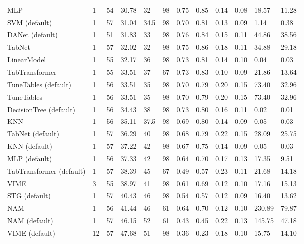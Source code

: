 \begin{tabular}{lllllrllllll}
MLP & 1 & 54 & 30.78 & 32 & 98 & 0.75 & 0.85 & 0.14 & 0.08 & 18.57 & 11.28 \\
SVM (default) & 1 & 57 & 31.04 & 34.5 & 98 & 0.70 & 0.81 & 0.13 & 0.09 & 1.14 & 0.38 \\
DANet (default) & 1 & 51 & 31.83 & 33 & 98 & 0.76 & 0.84 & 0.15 & 0.11 & 44.86 & 38.56 \\
TabNet & 1 & 57 & 32.02 & 32 & 98 & 0.75 & 0.86 & 0.18 & 0.11 & 34.88 & 29.18 \\
LinearModel & 1 & 55 & 32.17 & 36 & 98 & 0.73 & 0.81 & 0.14 & 0.10 & 0.04 & 0.03 \\
TabTransformer & 1 & 55 & 33.51 & 37 & 67 & 0.73 & 0.83 & 0.10 & 0.09 & 21.86 & 13.64 \\
TuneTables (default) & 1 & 56 & 33.51 & 35 & 98 & 0.70 & 0.79 & 0.20 & 0.15 & 73.40 & 32.96 \\
TuneTables & 1 & 56 & 33.51 & 35 & 98 & 0.70 & 0.79 & 0.20 & 0.15 & 73.40 & 32.96 \\
DecisionTree (default) & 1 & 56 & 34.43 & 38 & 98 & 0.73 & 0.80 & 0.16 & 0.11 & 0.02 & 0.01 \\
KNN & 1 & 56 & 35.11 & 37.5 & 98 & 0.69 & 0.80 & 0.14 & 0.09 & 0.05 & 0.03 \\
TabNet (default) & 1 & 57 & 36.29 & 40 & 98 & 0.68 & 0.79 & 0.22 & 0.15 & 28.09 & 25.75 \\
KNN (default) & 1 & 57 & 37.22 & 42 & 98 & 0.67 & 0.75 & 0.14 & 0.09 & 0.05 & 0.03 \\
MLP (default) & 1 & 56 & 37.33 & 42 & 98 & 0.64 & 0.70 & 0.17 & 0.13 & 17.35 & 9.51 \\
TabTransformer (default) & 1 & 57 & 38.39 & 45 & 67 & 0.49 & 0.57 & 0.23 & 0.11 & 21.68 & 14.18 \\
VIME & 3 & 55 & 38.97 & 41 & 98 & 0.61 & 0.69 & 0.12 & 0.10 & 17.16 & 15.13 \\
STG (default) & 1 & 57 & 40.43 & 46 & 98 & 0.54 & 0.57 & 0.12 & 0.09 & 16.40 & 13.62 \\
NAM & 1 & 56 & 41.44 & 46 & 61 & 0.64 & 0.70 & 0.12 & 0.10 & 230.89 & 79.87 \\
NAM (default) & 1 & 57 & 46.15 & 52 & 61 & 0.43 & 0.45 & 0.22 & 0.13 & 145.75 & 47.18 \\
VIME (default) & 12 & 57 & 47.68 & 51 & 98 & 0.36 & 0.23 & 0.18 & 0.10 & 15.75 & 14.10 \\
\bottomrule
\end{tabular}
